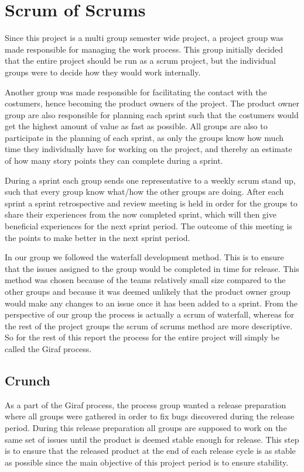 \section{Scrum of Scrums}
Since this project is a multi group semester wide project, a project group was made responsible for managing the work process.
This group initially decided that the entire project should be run as a scrum project, but the individual groups were to decide how they would work internally.

Another group was made responsible for facilitating the contact with the costumers, hence becoming the product owners of the project.
The product owner group are also responsible for planning each sprint such that the costumers would get the highest amount of value as fast as possible.
All groups are also to participate in the planning of each sprint, as only the groups know how much time they individually have for working on the project, and thereby an estimate of how many story points they can complete during a sprint.

During a sprint each group sends one representative to a weekly scrum stand up, such that every group know what/how the other groups are doing.
After each sprint a sprint retrospective and review meeting is held in order for the groups to share their experiences from the now completed sprint, which will then give beneficial experiences for the next sprint period.
The outcome of this meeting is the points to make better in the next sprint period.

In our group we followed the waterfall development method. 
This is to ensure that the issues assigned to the group would be completed in time for release. 
This method was chosen because of the teams relatively small size compared to the other groups and because it was deemed unlikely that the product owner group would make any changes to an issue once it has been added to a sprint.
From the perspective of our group the process is actually a scrum of waterfall, whereas for the rest of the project groups the scrum of scrums method are more descriptive.
So for the rest of this report the process for the entire project will simply be called the Giraf process.

\subsection{Crunch}
As a part of the Giraf process, the process group wanted a release preparation where all groups were gathered in order to fix bugs discovered during the release period. 
During this release preparation all groups are supposed to work on the same set of issues until the product is deemed stable enough for release. 
This step is to ensure that the released product at the end of each release cycle is as stable as possible since the main objective of this project period is to ensure stability.
